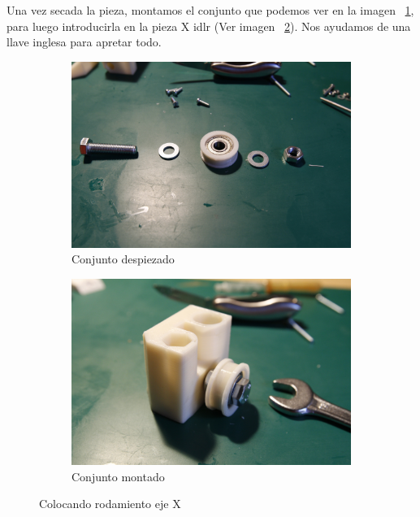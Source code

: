 			Una vez secada la pieza, montamos el conjunto que podemos ver en la imagen ~\ref{fig:conjunto.ejex}, para luego introducirla en la pieza X idlr (Ver imagen ~\ref{fig:conjuntoxidlr.ejex}). Nos ayudamos de una llave inglesa para apretar todo.\\
			\begin{figure}[H]
			        \centering
			        \begin{subfigure}[htb]{0.4\textwidth}
			                \centering
			                \includegraphics[width=\textwidth]{../../Fotos/56.jpg}
			                \caption{Conjunto despiezado}
			                \label{fig:conjunto.ejex}
			        \end{subfigure}
			        \begin{subfigure}[htb]{0.4\textwidth}
			                \centering
			                \includegraphics[width=\textwidth]{../../Fotos/57.jpg}
			                \caption{Conjunto montado}
			                \label{fig:conjuntoxidlr.ejex}
			        \end{subfigure}
			        \caption{Colocando rodamiento eje X}\label{fig:rodamientopieza.ejex}
			\end{figure}
